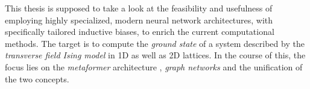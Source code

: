 This thesis is supposed to take a look at the feasibility and usefulness of employing highly specialized, modern neural network architectures, with specifically tailored inductive biases, to enrich the current computational methods. 
The target is to compute the \emph{ground state} of a system described by the \emph{transverse field Ising model} \cite{isingBook} in 1D as well as 2D lattices.
In the course of this, the focus lies on the \emph{metaformer} architecture \cite{metaformerPaper}, \emph{graph networks} \cite{relationalInductiveBiasesAndGraphNetworks} and the unification of the two concepts.
